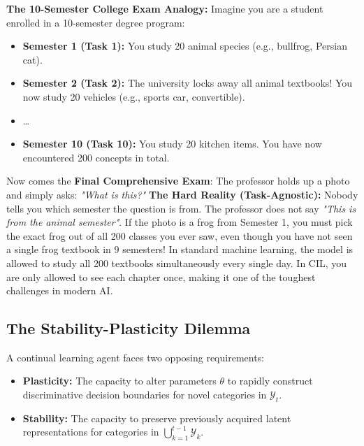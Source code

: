 \documentclass[11pt,a4paper]{article}
\begin{document}
\begin{callout}
\textbf{The 10-Semester College Exam Analogy:}\newline
Imagine you are a student enrolled in a 10-semester degree program:
\begin{itemize}[noitemsep]
    \item \textbf{Semester 1 (Task 1):} You study 20 animal species (e.g., bullfrog, Persian cat).
    \item \textbf{Semester 2 (Task 2):} The university locks away all animal textbooks! You now study 20 vehicles (e.g., sports car, convertible).
    \item \dots
    \item \textbf{Semester 10 (Task 10):} You study 20 kitchen items. You have now encountered 200 concepts in total.
\end{itemize}
Now comes the \textbf{Final Comprehensive Exam}: The professor holds up a photo and simply asks: \textit{"What is this?"}\newline
\textbf{The Hard Reality (Task-Agnostic):} Nobody tells you which semester the question is from. The professor does not say \textit{"This is from the animal semester"}. If the photo is a frog from Semester 1, you must pick the exact frog out of all 200 classes you ever saw, even though you have not seen a single frog textbook in 9 semesters! In standard machine learning, the model is allowed to study all 200 textbooks simultaneously every single day. In CIL, you are only allowed to see each chapter once, making it one of the toughest challenges in modern AI.
\end{callout}

\subsection{The Stability-Plasticity Dilemma}
A continual learning agent faces two opposing requirements:
\begin{itemize}[noitemsep]
    \item \textbf{Plasticity:} The capacity to alter parameters $\theta$ to rapidly construct discriminative decision boundaries for novel categories in $\mathcal{Y}_t$.
    \item \textbf{Stability:} The capacity to preserve previously acquired latent representations for categories in $\bigcup_{k=1}^{t-1} \mathcal{Y}_k$.
\end{itemize}
\end{document}
